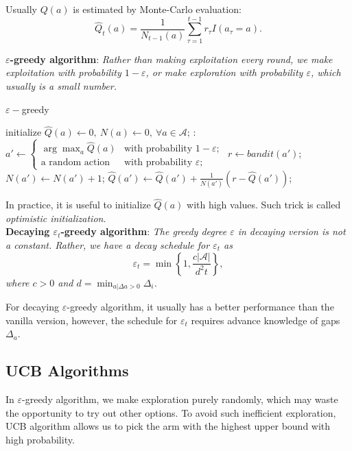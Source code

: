 \documentclass{progartcn}
\begin{document}
		 	Usually $Q(a)$ is estimated by Monte-Carlo evaluation:
		 	\[\hat{Q}_t(a)=\frac{1}{N_{t-1}(a)}\sum_{\tau=1}^{t-1}r_\tau I(a_\tau=a).\]

		 	\textbf{$\varepsilon$-greedy algorithm}: \textit{Rather than making exploitation every round, we make exploitation with probability $1-\varepsilon$, or make exploration with probability $\varepsilon$, which usually is a small number.}\\

		 	\begin{algorithm}[H]
			\caption{$\varepsilon-$greedy}
			\label{alg: eps}
			\begin{algorithmic}[1]
				\State initialize $\hat{Q}(a)\gets 0,\ N(a)\gets0,\ \forall a\in\mathcal{A}$;
				:
					\State $a'\gets\begin{cases}\arg\max_{a} \hat{Q}(a) & \text{with probability }1-\varepsilon;\\\text{a random action} & \text{with probability }\varepsilon;\end{cases}$
					\State $r\gets bandit(a')$;
					\State $N(a')\gets N(a')+1$;
					\State $\hat{Q}(a')\gets \hat{Q}(a')+\frac{1}{N(a')}(r-\hat{Q}(a'))$;
            	\EndFor
			\end{algorithmic}
			\end{algorithm}

			In practice, it is useful to initialize $\hat{Q}(a)$ with high values. Such trick is called \textit{optimistic initialization}.\\

            \textbf{Decaying $\varepsilon_t$-greedy algorithm}: \textit{The greedy degree $\varepsilon$ in decaying version is not a constant. Rather, we have a decay schedule for $\varepsilon_t$ as}
            \[\varepsilon_t=\min\left\{1,\frac{c|\mathcal{A}|}{d^2t}\right\},\]
            \textit{where $c>0$ and $d=\min_{a|\Delta a>0}\Delta_i$.}

            For decaying $\varepsilon$-greedy algorithm, it usually has a better performance than the vanilla version, however, the schedule for $\varepsilon_t$ requires advance knowledge of gaps $\Delta_a$.\\

    \subsection{UCB Algorithms}

    		In $\varepsilon$-greedy algorithm, we make exploration purely randomly, which may waste the opportunity to try out other options. To avoid such inefficient exploration, UCB algorithm allows us to pick the arm with the highest upper bound with high probability. 
\end{document}

